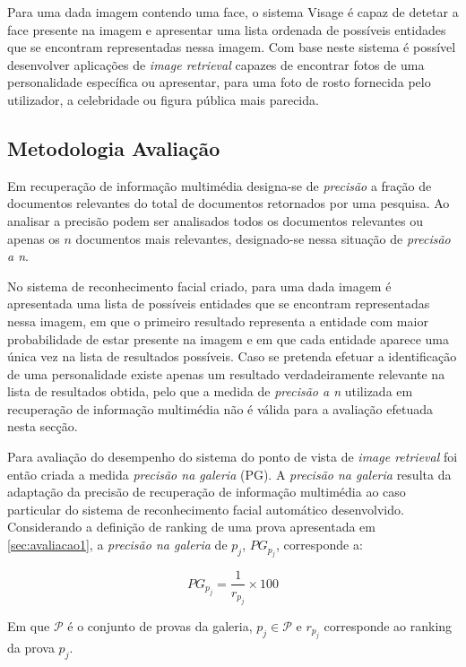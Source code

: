 Para uma dada imagem contendo uma face, o sistema Visage é capaz de detetar a face presente na imagem e apresentar uma lista ordenada de possíveis entidades que se encontram representadas nessa imagem. Com base neste sistema é possível desenvolver aplicações de \textit{image retrieval} capazes de encontrar fotos de uma personalidade específica ou apresentar, para uma foto de rosto fornecida pelo utilizador, a celebridade ou figura pública mais parecida.

\subsection{Metodologia Avaliação}
Em recuperação de informação multimédia designa-se de \textit{precisão} a fração de documentos relevantes do total de documentos retornados por uma pesquisa. Ao analisar a precisão podem ser analisados todos os documentos relevantes ou apenas os $n$ documentos mais relevantes, designado-se nessa situação de \textit{precisão a n}.

No sistema de reconhecimento facial criado, para uma dada imagem é apresentada uma lista de possíveis entidades que se encontram representadas nessa imagem, em que o primeiro resultado representa a entidade com maior probabilidade de estar presente na imagem e em que cada entidade aparece uma única vez na lista de resultados possíveis. Caso se pretenda efetuar a identificação de uma personalidade existe apenas um resultado verdadeiramente relevante na lista de resultados obtida, pelo que a medida de \textit{precisão a n} utilizada em recuperação de informação multimédia não é válida para a avaliação efetuada nesta secção.

Para avaliação do desempenho do sistema do ponto de vista de \textit{image retrieval} foi então criada a medida \textit{precisão na galeria} (PG). A \textit{precisão na galeria} resulta da adaptação da precisão de recuperação de informação multimédia ao caso particular do sistema de reconhecimento facial automático desenvolvido. Considerando a definição de ranking de uma prova apresentada em \ref{sec:avaliacao1}, a \textit{precisão na galeria} de $p_j$, $PG_{p_j}$, corresponde a:

\begin{equation}
PG_{p_j} = \frac{1}{r_{p_j}} \times 100
\end{equation}

Em que $\mathscr{P}$ é o conjunto de provas da galeria, $p_j \in \mathscr{P}$ e $r_{p_j}$ corresponde ao ranking da prova $p_j$.

